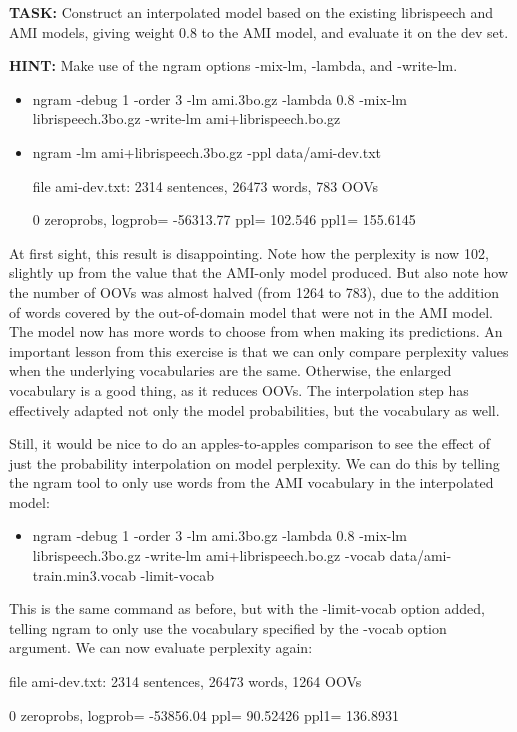 {\bf TASK:} Construct an interpolated model based on the existing librispeech and AMI models, giving weight 0.8 to the AMI model, and evaluate it on the dev set.

{\bf HINT:} Make use of the ngram options -mix-lm, -lambda, and -write-lm.
\begin{itemize}
	\item ngram -debug 1 -order 3 -lm ami.3bo.gz -lambda 0.8 -mix-lm librispeech.3bo.gz -write-lm ami+librispeech.bo.gz
	\item ngram -lm ami+librispeech.3bo.gz -ppl data/ami-dev.txt

			file ami-dev.txt: 2314 sentences, 26473 words, 783 OOVs

			0 zeroprobs, logprob= -56313.77 ppl= 102.546 ppl1= 155.6145
\end{itemize}

At first sight, this result is disappointing. Note how the perplexity is now 102, slightly up from the value that the AMI-only model produced. But also note how the number of OOVs was almost halved (from 1264 to 783), due to the addition of words covered by the out-of-domain model that were not in the AMI model. The model now has more words to choose from when making its predictions. An important lesson from this exercise is that we can only compare perplexity values when the underlying vocabularies are the same. Otherwise, the enlarged vocabulary is a good thing, as it reduces OOVs. The interpolation step has effectively adapted not only the model probabilities, but the vocabulary as well.

Still, it would be nice to do an apples-to-apples comparison to see the effect of just the probability interpolation on model perplexity. We can do this by telling the ngram tool to only use words from the AMI vocabulary in the interpolated model:
\begin{itemize}
	\item ngram -debug 1 -order 3 -lm ami.3bo.gz -lambda 0.8 -mix-lm librispeech.3bo.gz -write-lm ami+librispeech.bo.gz -vocab data/ami-train.min3.vocab -limit-vocab
\end{itemize}

This is the same command as before, but with the -limit-vocab option added, telling ngram to only use the vocabulary specified by the -vocab option argument. We can now evaluate perplexity again:

file ami-dev.txt: 2314 sentences, 26473 words, 1264 OOVs

0 zeroprobs, logprob= -53856.04 ppl= 90.52426 ppl1= 136.8931

